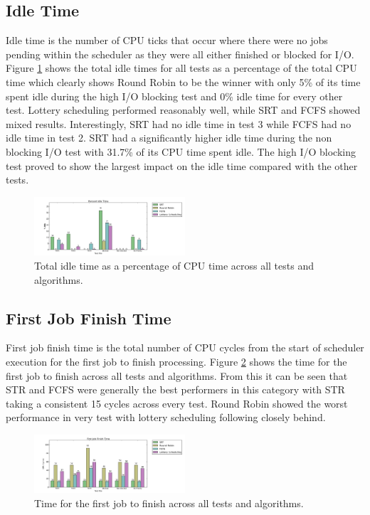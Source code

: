 \documentclass{acm_proc_article-sp}
\begin{document}
\subsection{Idle Time}
Idle time is the number of CPU ticks that occur where there were no jobs pending within the scheduler as they were all either finished or blocked for I/O. Figure \ref{fig:idle-time} shows the total idle times for all tests as a percentage of the total CPU time which clearly shows Round Robin to be the winner with only 5\% of its time spent idle during the high I/O blocking test and 0\% idle time for every other test. Lottery scheduling performed reasonably well, while SRT and FCFS showed mixed results. Interestingly, SRT had no idle time in test 3 while FCFS had no idle time in test 2. SRT had a significantly higher idle time during the non blocking I/O test with 31.7\% of its CPU time spent idle. The high I/O blocking test proved to show the largest impact on the idle time compared with the other tests.

\begin{figure}[H]
\centering
\includegraphics[width=0.5\textwidth]{idle_time_per.png}
\caption{Total idle time as a percentage of CPU time across all tests and algorithms.}
\label{fig:idle-time}
\end{figure}

\subsection{First Job Finish Time}
\label{results-fstjob-time}
First job finish time is the total number of CPU cycles from the start of scheduler execution for the first job to finish processing. Figure \ref{fig:fstjob-time} shows the time for the first job to finish across all tests and algorithms. From this it can be seen that STR and FCFS were generally the best performers in this category with STR taking a consistent 15 cycles across every test. Round Robin showed the worst performance in very test with lottery scheduling following closely behind.

\begin{figure}[H]
\centering
\includegraphics[width=0.5\textwidth]{fstjob_time.png}
\caption{Time for the first job to finish across all tests and algorithms.}
\label{fig:fstjob-time}
\end{figure}
\end{document}
